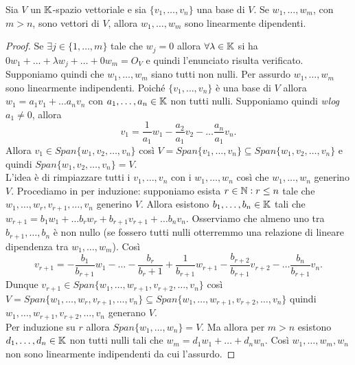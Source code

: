 \begin{thm}
	Sia $ V $ un $ \mathbb{K} $-spazio vettoriale e sia $ \{v_1, \ldots, v_n\} $ una base di $ V $. Se $ w_1, \ldots, w_m $, con $ m > n $, sono vettori di $ V $, allora $ w_1, \ldots, w_m $ sono linearmente dipendenti.
\end{thm}
\begin{proof}
	Se $ \exists j \in \{1, \ldots, m\} $ tale che $ w_j = 0 $ allora $ \forall \lambda \in \mathbb{K} $ si ha $ 0 w_1 + \ldots + \lambda w_j + \ldots + 0 w_m = O_V $ e quindi l'enunciato risulta verificato. Supponiamo quindi che $ w_1, \ldots, w_m $ siano tutti non nulli. Per assurdo $ w_1, \ldots, w_m $ sono linearmente indipendenti. Poiché $ \{v_1, \ldots, v_n\} $ è una base di $ V $ allora $ w_1 = a_1 v_1 + \ldots a_n v_n $ con $ a_1, \ldots, a_n \in \mathbb{K} $ non tutti nulli. Supponiamo quindi \emph{wlog} $ a_1 \neq 0 $, allora \[v_1 = \frac{1}{a_1} w_1 - \frac{a_2}{a_1} v_2 - \ldots \frac{a_n}{a_1}v_n.\] Allora $ v_1 \in Span{\{w_1, v_2, \ldots, v_n\}} $ così $ V = Span{\{v_1, \ldots, v_n\}} \subseteq Span{\{w_1, v_2, \ldots, v_n\}} $ e quindi $ Span{\{w_1, v_2, \ldots, v_n\}} = V $. \\
	L'idea è di rimpiazzare tutti i $ v_1, \ldots, v_n $ con i $ w_1, \ldots, w_n $ così che $ w_1, \ldots, w_n $ generino $ V $. Procediamo in per induzione: supponiamo esista $ r \in \mathbb{N} : r \leq n $ tale che $ w_1, \ldots, w_r, v_{r + 1}, \ldots, v_n $ generino $ V $. Allora esistono $ b_1, \ldots, b_n \in \mathbb{K} $ tali che $ w_{r + 1} = b_1 w_1 + \ldots b_{r} w_r + b_{r + 1} v_{r + 1} + \ldots b_n v_n $. Osserviamo che almeno uno tra $ b_{r + 1}, \ldots, b_n $ è non nullo (se fossero tutti nulli otterremmo una relazione di lineare dipendenza tra $ w_1, \ldots, w_m $). Così \[v_{r + 1} = - \frac{b_1}{b_{r + 1}} w_1 - \ldots - \frac{b_r}{b_r + 1} + \frac{1}{b_{r + 1}} w_{r + 1} - \frac{b_{r + 2}}{b_{r + 1}} v_{r + 2} - \ldots \frac{b_n}{b_{r + 1}} v_{n}.\] Dunque $ v_{r + 1} \in Span{\{w_1, \ldots, w_{r + 1}, v_{r + 2}, \ldots, v_n\}} $ così $ V = Span{\{w_1, \ldots, w_r, v_{r + 1}, \ldots, v_n\} }\subseteq Span{\{w_1, \ldots, w_{r + 1}, v_{r + 2}, \ldots, v_n\}} $ quindi $ w_1, \ldots, w_{r + 1}, v_{r + 2}, \ldots, v_n $ generano $ V $. \\
	Per induzione su $ r $ allora $ Span{\{w_1, \ldots, w_n\}} = V $. Ma allora per $ m > n $ esistono $ d_1, \ldots, d_n \in \mathbb{K} $ non tutti nulli tali che $ w_m = d_1 w_1 + \ldots + d_n w_n $. Così $ w_1, \ldots, w_m, w_n $ non sono linearmente indipendenti da cui l'assurdo. 
\end{proof}



